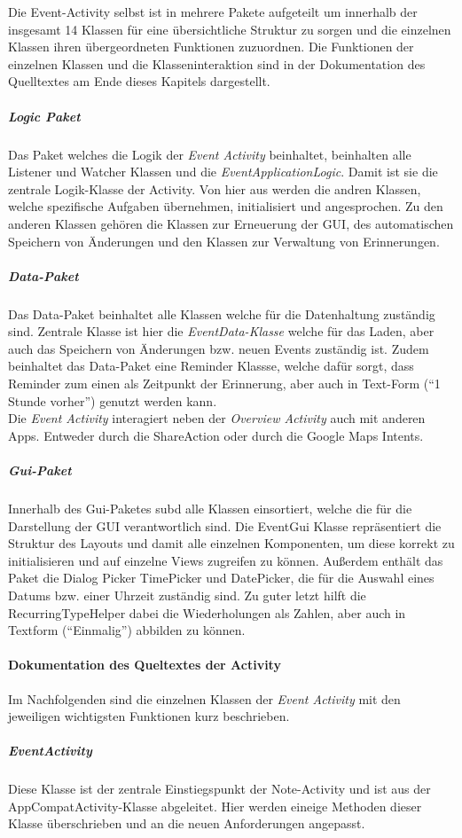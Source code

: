 Die Event-Activity selbst ist in mehrere Pakete aufgeteilt um innerhalb der insgesamt 14 Klassen für eine übersichtliche Struktur zu sorgen und die einzelnen Klassen ihren übergeordneten Funktionen zuzuordnen. Die Funktionen der einzelnen Klassen und die Klasseninteraktion sind in der Dokumentation des Quelltextes am Ende dieses Kapitels dargestellt.

\subparagraph{Logic Paket}
Das Paket welches die Logik der \textit{Event Activity} beinhaltet, beinhalten alle Listener und Watcher Klassen und die \textit{EventApplicationLogic}. Damit ist sie die zentrale Logik-Klasse der Activity. Von hier aus werden die andren Klassen, welche spezifische Aufgaben übernehmen, initialisiert und angesprochen. Zu den anderen Klassen gehören die Klassen zur Erneuerung der GUI, des automatischen Speichern von Änderungen und den Klassen zur Verwaltung von Erinnerungen.

\subparagraph{Data-Paket}
Das Data-Paket beinhaltet alle Klassen welche für die Datenhaltung zuständig sind. Zentrale Klasse ist hier die \textit{EventData-Klasse} welche für das Laden, aber auch das Speichern von Änderungen bzw. neuen Events zuständig ist. Zudem beinhaltet das Data-Paket eine Reminder Klassse, welche dafür sorgt, dass Reminder zum einen als Zeitpunkt der Erinnerung, aber auch in Text-Form (``1 Stunde vorher'') genutzt werden kann. \\
Die \textit{Event Activity} interagiert neben der \textit{Overview Activity} auch mit anderen Apps. Entweder durch die ShareAction oder durch die Google Maps Intents.

\subparagraph{Gui-Paket}
Innerhalb des Gui-Paketes subd alle Klassen einsortiert, welche die für die Darstellung der GUI verantwortlich sind. Die EventGui Klasse repräsentiert die Struktur des Layouts und damit alle einzelnen Komponenten, um diese korrekt zu initialisieren und auf einzelne Views zugreifen zu können. Außerdem enthält das Paket die Dialog Picker TimePicker und DatePicker, die für die Auswahl eines Datums bzw. einer Uhrzeit zuständig sind. Zu guter letzt hilft die RecurringTypeHelper dabei die Wiederholungen als Zahlen, aber auch in Textform (``Einmalig'') abbilden zu können.

\paragraph{Dokumentation des Queltextes der Activity}
Im Nachfolgenden sind die einzelnen Klassen der \textit{Event Activity} mit den jeweiligen wichtigsten Funktionen kurz beschrieben.
\subparagraph{EventActivity}
Diese Klasse ist der zentrale Einstiegspunkt der Note-Activity und ist aus der AppCompatActivity-Klasse abgeleitet. Hier werden eineige Methoden dieser Klasse überschrieben und an die neuen Anforderungen angepasst.

